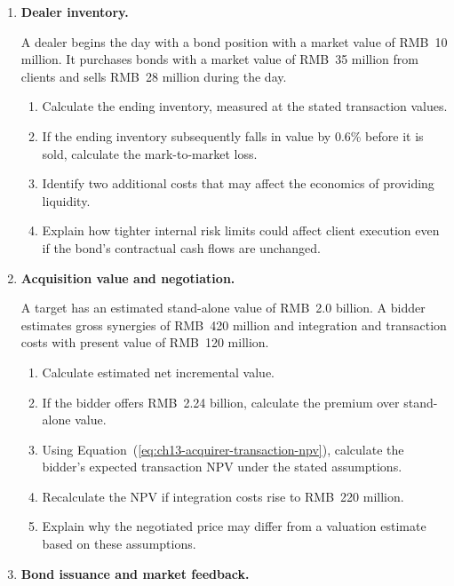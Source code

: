 \begin{enumerate}
\item \textbf{Dealer inventory.}

A dealer begins the day with a bond position with a market value of RMB~10 million. It purchases bonds with a market value of RMB~35 million from clients and sells RMB~28 million during the day.

\begin{enumerate}

\item Calculate the ending inventory, measured at the stated transaction values.

\item If the ending inventory subsequently falls in value by 0.6\%  before it is sold, calculate the mark-to-market loss.

\item Identify two additional costs that may affect the economics of providing liquidity.

\item Explain how tighter internal risk limits could affect client execution even if the bond's contractual cash flows are unchanged.

\end{enumerate}

\item \textbf{Acquisition value and negotiation.}

A target has an estimated stand-alone value of RMB~2.0 billion. A bidder estimates gross synergies of RMB~420 million and integration and transaction costs with present value of RMB~120 million.

\begin{enumerate}
\item Calculate estimated net incremental value.
\item If the bidder offers RMB~2.24 billion, calculate the premium over stand-alone value.
\item Using Equation~(\ref{eq:ch13-acquirer-transaction-npv}), calculate the bidder's expected transaction NPV under the stated assumptions.
\item Recalculate the NPV if integration costs rise to RMB~220 million.
\item Explain why the negotiated price may differ from a valuation estimate based on these assumptions.
\end{enumerate}

\item \textbf{Bond issuance and market feedback.}


\end{enumerate}
